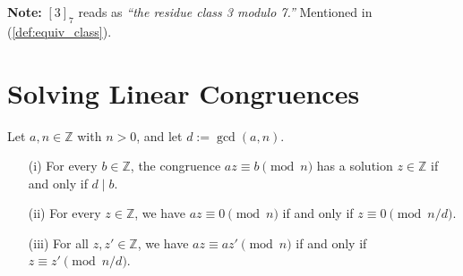 \begin{Note}
    \textbf{Note:} $[3]_{7}$ reads as \textit{``the residue class 3 modulo 7.''} Mentioned in (\ref{def:equiv_class}).
\end{Note}

\newpage

\section{Solving Linear Congruences}

\begin{theo}

    \label{theo:mod_mult_id}
    
Let \(a, n \in \mathbb{Z}\) with \(n > 0\), and let \(d := \gcd(a, n)\).
\begin{itemize}
    \item[(i)] For every \(b \in \mathbb{Z}\), the congruence \(az \equiv b \pmod{n}\) has a solution \(z \in \mathbb{Z}\) if and only if \(d \mid b\).
    
    \item[(ii)] For every \(z \in \mathbb{Z}\), we have \(az \equiv 0 \pmod{n}\) if and only if \(z \equiv 0 \pmod{n/d}\).
    
    \item[(iii)] For all \(z, z' \in \mathbb{Z}\), we have \(az \equiv az' \pmod{n}\) if and only if \(z \equiv z' \pmod{n/d}\).
\end{itemize}
\end{theo}
